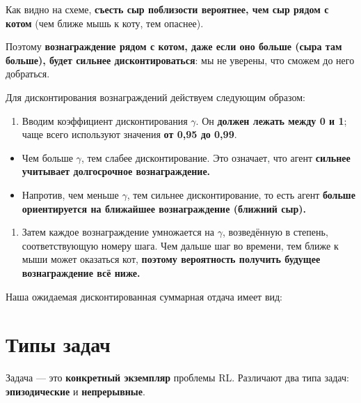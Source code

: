 \documentclass[11pt,a4paper]{article}
\begin{document}

Как видно на схеме, \textbf{съесть сыр поблизости вероятнее, чем сыр рядом с котом} (чем ближе мышь к коту, тем опаснее).

Поэтому \textbf{вознаграждение рядом с котом, даже если оно больше (сыра там больше), будет сильнее дисконтироваться}: мы не уверены, что сможем до него добраться.

Для дисконтирования вознаграждений действуем следующим образом:

\begin{enumerate}
\def\labelenumi{\arabic{enumi}.}
\tightlist
\item
  Вводим коэффициент дисконтирования \(\gamma\). Он \textbf{должен лежать между 0 и 1}; чаще всего используют значения \textbf{от 0,95 до 0,99}.
\end{enumerate}

\begin{itemize}
\tightlist
\item
  Чем больше \(\gamma\), тем слабее дисконтирование. Это означает, что агент \textbf{сильнее учитывает долгосрочное вознаграждение.}
\item
  Напротив, чем меньше \(\gamma\), тем сильнее дисконтирование, то есть агент \textbf{больше ориентируется на ближайшее вознаграждение (ближний сыр).}
\end{itemize}

\begin{enumerate}
\def\labelenumi{\arabic{enumi}.}
\setcounter{enumi}{1}
\tightlist
\item
  Затем каждое вознаграждение умножается на \(\gamma\), возведённую в степень, соответствующую номеру шага. Чем дальше шаг во времени, тем ближе к мыши может оказаться кот, \textbf{поэтому вероятность получить будущее вознаграждение всё ниже.}
\end{enumerate}

Наша ожидаемая дисконтированная суммарная отдача имеет вид:


\section{Типы задач}\label{type-of-tasks}

Задача --- это \textbf{конкретный экземпляр} проблемы RL. Различают два типа задач: \textbf{эпизодические} и \textbf{непрерывные}.
\end{document}
